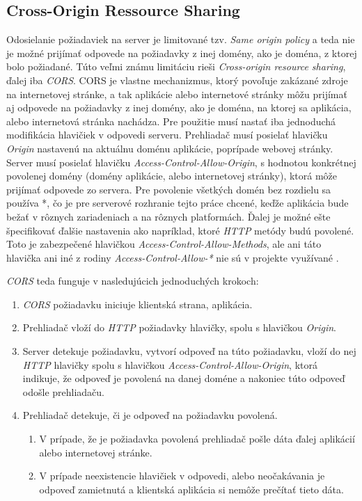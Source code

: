 \subsection{Cross-Origin Ressource Sharing}
Odosielanie požiadaviek na server je limitované tzv. \textit{Same origin policy} a teda nie je možné prijímať odpovede na požiadavky z inej domény, ako je doména, z ktorej bolo požiadané. Túto veľmi známu limitáciu rieši \textit{Cross-origin resource sharing}, ďalej iba \textit{CORS}. CORS je vlastne mechanizmus, ktorý povoľuje zakázané zdroje na internetovej stránke, a tak aplikácie alebo internetové stránky môžu prijímať aj odpovede na požiadavky z inej domény, ako je doména, na ktorej sa aplikácia, alebo internetová stránka nachádza. Pre použitie musí nastať iba jednoduchá modifikácia hlavičiek v odpovedi serveru. Prehliadač musí posielať hlavičku \textit{Origin} nastavenú na aktuálnu doménu aplikácie, poprípade webovej stránky. Server musí posielať hlavičku \textit{Access-Control-Allow-Origin}, s hodnotou konkrétnej povolenej domény (domény aplikácie, alebo internetovej stránky), ktorá môže prijímať odpovede zo servera. Pre povolenie všetkých domén bez rozdielu sa používa *, čo je pre serverové rozhranie tejto práce chcené, keďže aplikácia bude bežať v rôznych zariadeniach a na rôznych platformách. Ďalej je možné ešte špecifikovať ďalšie nastavenia ako napríklad, ktoré \textit{HTTP} metódy budú povolené. Toto je zabezpečené hlavičkou \textit{Access-Control-Allow-Methods}, ale ani táto hlavička ani iné z rodiny \textit{Access-Control-Allow-*} nie sú v projekte využívané \cite{Hossain2015}. 

\textit{CORS} teda funguje v nasledujúcich jednoduchých krokoch:
\begin{enumerate}
\item \textit{CORS} požiadavku iniciuje klientská strana, aplikácia.
\item Prehliadač vloží do \textit{HTTP} požiadavky hlavičky, spolu s hlavičkou \textit{Origin}.
\item Server detekuje požiadavku, vytvorí odpoveď na túto požiadavku, vloží do nej \textit{HTTP} hlavičky spolu s hlavičkou \textit{Access-Control-Allow-Origin}, ktorá indikuje, že odpoveď je povolená na danej doméne a nakoniec túto odpoveď odošle prehliadaču.
\item Prehliadač detekuje, či je odpoveď na požiadavku povolená.
    \begin{enumerate}
    \item V prípade, že je požiadavka povolená prehliadač pošle dáta ďalej aplikácií alebo internetovej stránke.
    \item V prípade neexistencie hlavičiek v odpovedi, alebo neočakávania je odpoveď zamietnutá a klientská aplikácia si nemôže prečítať tieto dáta.
    \end{enumerate}
\end{enumerate}

